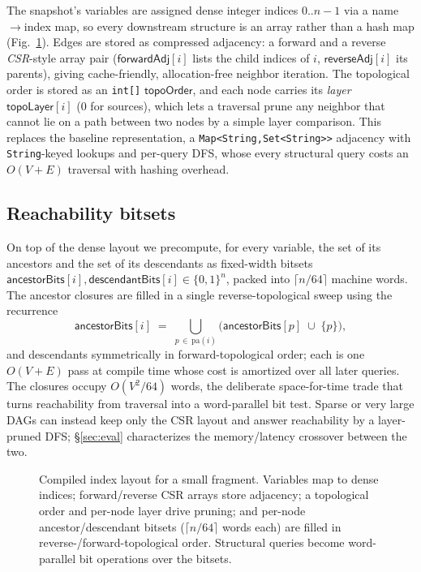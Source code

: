 The snapshot's variables are assigned dense integer indices $0..n{-}1$ via a
\textsf{name}$\to$\textsf{index} map, so every downstream structure is an array
rather than a hash map (Fig.~\ref{fig:index}). Edges are stored as compressed
adjacency: a forward and a reverse \emph{CSR}-style array pair
($\textsf{forwardAdj}[i]$ lists the child indices of $i$, $\textsf{reverseAdj}[i]$
its parents), giving cache-friendly, allocation-free neighbor iteration. The
topological order is stored as an \texttt{int[]} $\textsf{topoOrder}$, and each
node carries its \emph{layer} $\textsf{topoLayer}[i]$ (0 for sources), which lets
a traversal prune any neighbor that cannot lie on a path between two nodes by a
simple layer comparison. This replaces the baseline representation, a
\lstinline[style=causaldsl]|Map<String,Set<String>>| adjacency with
\texttt{String}-keyed lookups and per-query DFS, whose every structural query
costs an $O(V{+}E)$ traversal with hashing overhead.

\subsection{Reachability bitsets}\label{sec:index:bitsets}

On top of the dense layout we precompute, for every variable, the set of its
ancestors and the set of its descendants as fixed-width bitsets
$\textsf{ancestorBits}[i],\textsf{descendantBits}[i]\in\{0,1\}^{n}$, packed into
$\lceil n/64\rceil$ machine words. The ancestor closures are filled in a single
reverse-topological sweep using the recurrence
\[
  \textsf{ancestorBits}[i] \;=\; \bigcup_{p\,\in\,\mathrm{pa}(i)}
      \bigl(\textsf{ancestorBits}[p] \;\cup\; \{p\}\bigr),
\]
and descendants symmetrically in forward-topological order; each is one
$O(V{+}E)$ pass at compile time whose cost is amortized over all later queries.
The closures occupy $O(V^2/64)$ words, the deliberate space-for-time trade that
turns reachability from traversal into a word-parallel bit test. Sparse or very
large DAGs can instead keep only the CSR layout and answer reachability by a
layer-pruned DFS; \S\ref{sec:eval} characterizes the memory/latency crossover
between the two.

\begin{figure}[t]\centering
  \resizebox{\linewidth}{!}{}
  \caption{Compiled index layout for a small fragment. Variables map to dense
  indices; forward/reverse CSR arrays store adjacency; a topological order and
  per-node layer drive pruning; and per-node ancestor/descendant bitsets
  ($\lceil n/64\rceil$ words each) are filled in reverse-/forward-topological
  order. Structural queries become word-parallel bit operations over the
  bitsets.}
  \label{fig:index}
\end{figure}

